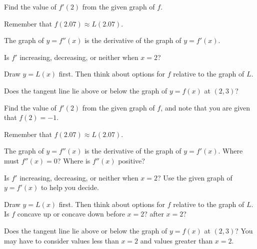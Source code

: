 \begin{smallhint}
\ba
	\item Find the value of $f'(2)$ from the given graph of $f$.
	\item Remember that $f(2.07) \approx L(2.07)$.
	\item The graph of $y = f''(x)$ is the derivative of the graph of $y = f'(x)$.
	\item Is $f'$ increasing, decreasing, or neither when $x = 2$? 
	\item Draw $y = L(x)$ first.  Then think about options for $f$ relative to the graph of $L$.  
	\item Does the tangent line lie above or below the graph of $y = f(x)$ at $(2,3)$?
\ea
\end{smallhint}
\begin{bighint}
\ba
	\item Find the value of $f'(2)$ from the given graph of $f$, and note that you are given that $f(2) = -1$.
	\item Remember that $f(2.07) \approx L(2.07)$.
	\item The graph of $y = f''(x)$ is the derivative of the graph of $y = f'(x)$.  Where must $f''(x) = 0$?  Where is $f''(x)$ positive?
	\item Is $f'$ increasing, decreasing, or neither when $x = 2$?  Use the given graph of $y = f'(x)$ to help you decide.
	\item Draw $y = L(x)$ first.  Then think about options for $f$ relative to the graph of $L$.  Is $f$ concave up or concave down before $x = 2$?  after $x = 2$?
	\item Does the tangent line lie above or below the graph of $y = f(x)$ at $(2,3)$?  You may have to consider values less than $x = 2$ and values greater than $x = 2$.
\ea
\end{bighint}
